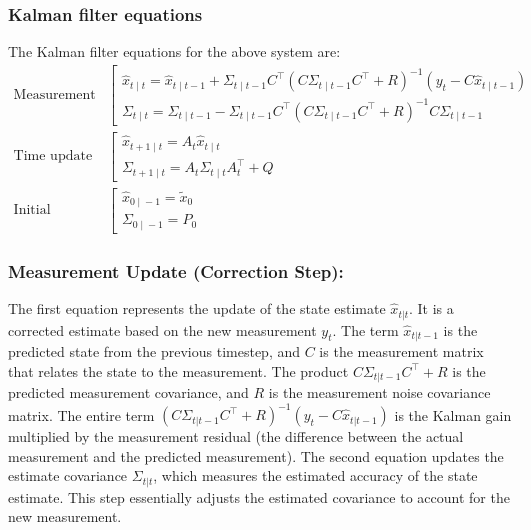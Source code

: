 \documentclass{report}
\begin{document}
\subsubsection*{Kalman filter equations}
The Kalman filter equations for the above system are:
\begin{align}
    \text{Measurement} &
    \left[
    \begin{array}{l}
      \hat{x}_{t{}\mid{}t}
      {}={}
      \hat{x}_{t{}\mid{}t-1}
      {}+{}
      \Sigma_{t{}\mid{}t-1}C^\intercal
      (C\Sigma_{t{}\mid{}t-1}C^\intercal + R)^{-1}(y_t - C\hat{x}_{t{}\mid{}t-1})
      \\
      \Sigma_{t{}\mid{}t}
      {}={}
      \Sigma_{t{}\mid{}t-1}
      {}-{}
      \Sigma_{t{}\mid{}t-1}C^\intercal
      (C\Sigma_{t{}\mid{}t-1}C^\intercal + R)^{-1}
      C\Sigma_{t{}\mid{}t-1}
    \end{array}
    \right.
    \\
    \text{Time update}        &
    \left[
    \begin{array}{l}
      \hat{x}_{t+1{}\mid{}t}
      {}={}
      A_t \hat{x}_{t{}\mid{}t}
      \\
      \Sigma_{t+1{}\mid{}t}
      {}={}
      A_t \Sigma_{t{}\mid{}t} A_t^\intercal + Q
    \end{array}
    \right.
    \\
    \text{Initial conditions} &
    \left[
    \begin{array}{l}
      \hat{x}_{0{}\mid{}-1}
      {}={}
      \tilde{x}_0
      \\
      \Sigma_{0{}\mid{}-1}
      {}={}
      P_0
    \end{array}
    \right.
  \end{align}

  \subsubsection*{Measurement Update (Correction Step):}
  The first equation represents the update of the state estimate
  $\hat{x}_{t|t}$. It is a corrected estimate based on the new measurement
  $y_t$. The term $\hat{x}_{t|t-1}$ is the predicted state from the previous
  timestep, and $C$ is the measurement matrix that relates the state to the
  measurement. The product $C\Sigma_{t|t-1}C^\intercal + R$ is the predicted
  measurement covariance, and $R$ is the measurement noise covariance matrix.
  The entire term $(C\Sigma_{t|t-1}C^\intercal + R)^{-1}(y_t -
  C\hat{x}_{t|t-1})$ is the Kalman gain multiplied by the measurement residual
  (the difference between the actual measurement and the predicted measurement).
  The second equation updates the estimate covariance $\Sigma_{t|t}$, which
  measures the estimated accuracy of the state estimate. This step essentially
  adjusts the estimated covariance to account for the new measurement.
\end{document}
